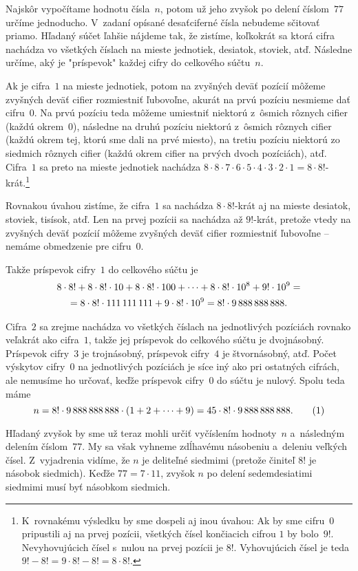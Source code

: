 ﻿{%
Najskôr vypočítame hodnotu čísla~$n$, potom už jeho zvyšok po delení číslom~$77$ určíme jednoducho. V~zadaní opísané desaťciferné čísla nebudeme sčitovať priamo. Hľadaný súčet ľahšie nájdeme tak, že zistíme, koľkokrát sa ktorá cifra nachádza vo všetkých číslach na mieste jednotiek, desiatok, stoviek, atď. Následne určíme, aký je "príspevok" každej cifry do celkového súčtu~$n$.

Ak je cifra~$1$ na mieste jednotiek, potom na zvyšných deväť pozícií môžeme zvyšných deväť cifier rozmiestniť ľubovoľne, akurát na prvú pozíciu nesmieme dať cifru~$0$. Na prvú pozíciu teda môžeme umiestniť niektorú z~ôsmich rôznych cifier (každú okrem~$0$), následne na druhú pozíciu niektorú z~ôsmich rôznych cifier (každú okrem tej, ktorú sme dali na prvé miesto), na tretiu pozíciu niektorú zo siedmich rôznych cifier (každú okrem cifier na prvých dvoch pozíciách), atď. Cifra~$1$ sa preto na mieste jednotiek nachádza $8\cdot8\cdot7\cdot6\cdot5\cdot4\cdot3\cdot2\cdot1=8\cdot8!$-krát.\footnote{K~rovnakému výsledku by sme dospeli aj inou úvahou: Ak by sme cifru~$0$ pripustili aj na prvej pozícii, všetkých čísel končiacich cifrou $1$ by bolo~$9!$. Nevyhovujúcich čísel s~nulou na prvej pozícii je 8!. Vyhovujúcich čísel je teda $9!-8!=9\cdot8!-8!=8\cdot8!$.}

Rovnakou úvahou zistíme, že cifra~$1$ sa nachádza $8\cdot8!$-krát aj na mieste desiatok, stoviek, tisísok, atď. Len na prvej pozícii sa nachádza až $9!$-krát, pretože vtedy na zvyšných deväť pozícií môžeme zvyšných deväť cifier rozmiestniť ľubovoľne -- nemáme obmedzenie pre cifru~$0$.

Takže príspevok cifry~$1$ do celkového súčtu je
$$
\gathered
8\cdot8!+8\cdot8!\cdot10+8\cdot8!\cdot100+\cdots+8\cdot8!\cdot10^8+9!\cdot10^9=\\
=8\cdot8!\cdot111\,111\,111+9\cdot8!\cdot10^9=8!\cdot9\,888\,888\,888.
\endgathered
$$

Cifra~$2$ sa zrejme nachádza vo všetkých číslach na jednotlivých pozíciách rovnako veľakrát ako cifra~$1$, takže jej príspevok do celkového súčtu je dvojnásobný. Príspevok cifry~$3$ je trojnásobný, príspevok cifry~$4$ je štvornásobný, atď. Počet výskytov cifry~$0$ na jednotlivých pozíciách je síce iný ako pri ostatných cifrách, ale nemusíme ho určovať, keďže príspevok cifry~$0$ do súčtu je nulový. Spolu teda máme
$$
n=8!\cdot9\,888\,888\,888\cdot(1+2+\cdots+9)=45\cdot8!\cdot9\,888\,888\,888.
\tag1
$$

Hľadaný zvyšok by sme už teraz mohli určiť vyčíslením hodnoty~$n$ a~následným delením číslom~$77$. My sa však vyhneme zdĺhavému násobeniu a~deleniu veľkých čísel. Z~vyjadrenia  vidíme, že $n$ je deliteľné siedmimi (pretože činiteľ $8!$ je násobok siedmich). Keďže $77=7\cdot11$, zvyšok $n$ po delení sedemdesiatimi siedmimi musí byť násobkom siedmich.

}
